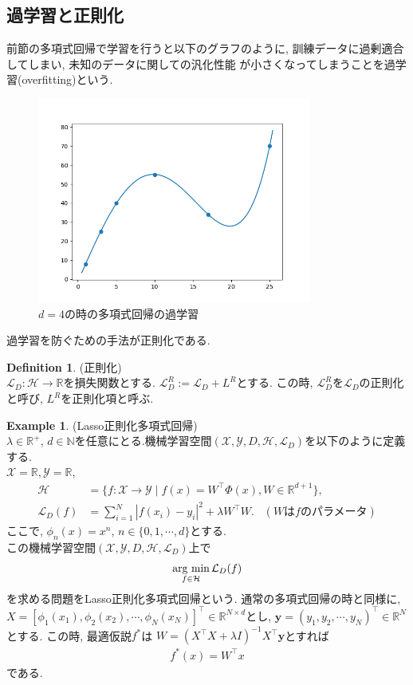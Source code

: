 \documentclass[11pt, a4paper, dvipdfmx]{jsarticle}
\theoremstyle{definition}
\newtheorem{Definition+}[Axiom+]{Definition}
\newtheorem{Example+}[Axiom+]{Example}
\newcommand{\N}{\mathbb{N}}
\newcommand{\R}{\mathbb{R}}
\newcommand{\X}{\mathcal{X}}
\newcommand{\Y}{\mathcal{Y}}
\newcommand{\Hil}{\mathcal{H}}
\newcommand{\Loss}{\mathcal{L}_{D}}
\newcommand{\MLsp}{(\X, \Y, D, \Hil, \Loss)}
\newcommand{\argmin}{\mathop{\rm arg~min}\limits}
\begin{document}
\subsection{過学習と正則化}
前節の多項式回帰で学習を行うと以下のグラフのように, 訓練データに過剰適合してしまい, 未知のデータに関しての汎化性能
が小さくなってしまうことを過学習(overfitting)という. 
\begin{figure}[H]
    \centering
    \includegraphics[width = 9.0cm]{overfitting_PR.png}
    \caption{$d = 4$の時の多項式回帰の過学習}
\end{figure}
過学習を防ぐための手法が正則化である.
\begin{Definition+}(正則化)\\
    $\Loss:\Hil\to\R$を損失関数とする. $\Loss^{R} := \Loss + L^{R}$とする.
    この時, $\Loss^{R}$を$\Loss$の正則化と呼び, $L^R$を正則化項と呼ぶ.
\end{Definition+}
\begin{Example+}(Lasso正則化多項式回帰)\\
    $\lambda\in\R^{+}$, $d\in\N$を任意にとる.機械学習空間$\MLsp$を以下のように定義する.\\
    $\X = \R, \Y = \R$, 
    \begin{align*}
        \Hil &= \{f:\X\to\Y\mid f(x) = W^{\top}\Phi(x), W\in\R^{d + 1}\},\\
        \Loss(f) &= \sum_{i = 1}^{N}|f(x_i) - y_i|^2+\lambda W^\top W.\hspace{10pt}　(W\text{は$f$のパラメータ})
    \end{align*}
    ここで, $\phi_{n}(x) = x^{n}$, $n\in\{0, 1, \cdots, d\}$とする.\\
    この機械学習空間$\MLsp$上で
    \begin{align*}
        \argmin_{f\in\Hil}\Loss(f)
    \end{align*}
    を求める問題をLasso正則化多項式回帰という. 通常の多項式回帰の時と同様に, $X = [\phi_{1}(x_1), \phi_{2}(x_{2}), \cdots, \phi_{N}(x_N)]^{\top}\in\R^{N\times d}$とし, 
    $\mathbf{y} = (y_{1}, y_{2}, \cdots, y_{N})^{\top}\in\R^{N}$とする. この時, 最適仮説$f^{*}$は
    $W = (X^\top X + \lambda I)^{-1}X^\top\mathbf{y}$とすれば
    \begin{align*}
        f^{*}(x) = W^{\top}x
    \end{align*}
    である. 
\end{Example+}
\end{document}
